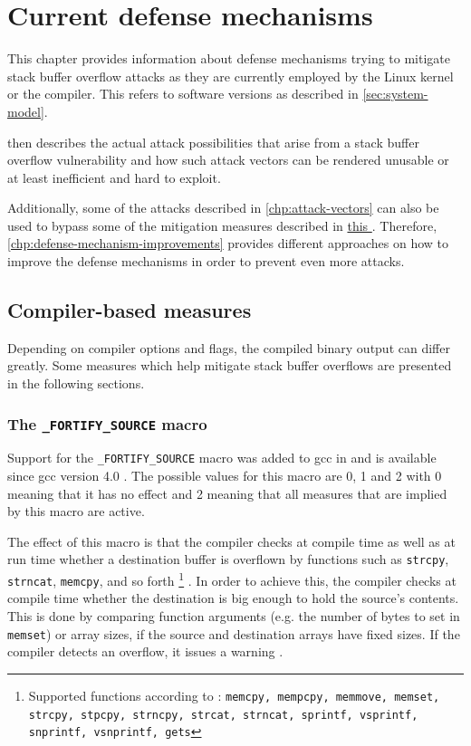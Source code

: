 \chapter{Current defense mechanisms}
\label{chp:current-defense-mechanisms}

This chapter provides information about defense mechanisms trying to mitigate stack buffer overflow attacks as they are currently employed by the Linux kernel or the compiler.
This refers to software versions as described in \cref{sec:system-model}.

 then describes the actual attack possibilities that arise from a stack buffer overflow vulnerability and how such attack vectors can be rendered unusable or at least inefficient and hard to exploit.

Additionally, some of the attacks described in \cref{chp:attack-vectors} can also be used to bypass some of the mitigation measures described in \hyperref[chp:current-defense-mechanisms]{this }.
Therefore, \cref{chp:defense-mechanism-improvements} provides different approaches on how to improve the defense mechanisms in order to prevent even more attacks.

\section{Compiler-based measures}
\label{sec:compiler-based-measures}

Depending on compiler options and flags, the compiled binary output can differ greatly.
Some measures which help mitigate stack buffer overflows are presented in the following sections.

\subsection{The \texttt{\_FORTIFY\_SOURCE} macro}
\label{subsec:fortify-source}

Support for the \texttt{\_FORTIFY\_SOURCE} macro was added to \gls{gcc} in  and is available since \gls{gcc} version 4.0 \cite{Sharma2014}.
The possible values for this macro are 0, 1 and 2 with 0 meaning that it has no effect and 2 meaning that all measures that are implied by this macro are active.

The effect of this macro is that the compiler checks at compile time as well as at run time whether a destination buffer is overflown by functions such as \texttt{strcpy}, \texttt{strncat}, \texttt{memcpy}, and so forth%
	\footnote{Supported functions according to \cite{Kerrisk2020,Sharma2014}: \texttt{memcpy, mempcpy, memmove, memset, strcpy, stpcpy, strncpy, strcat, strncat, sprintf, vsprintf, snprintf, vsnprintf, gets}}%
.
In order to achieve this, the compiler checks at compile time whether the destination is big enough to hold the source's contents.
This is done by comparing function arguments (e.g. the number of bytes to set in \texttt{memset}) or array sizes, if the source and destination arrays have fixed sizes.
If the compiler detects an overflow, it issues a warning \cite{Jelinek2004,Kerrisk2020,Sharma2014,Sidhpurwala2018}.


